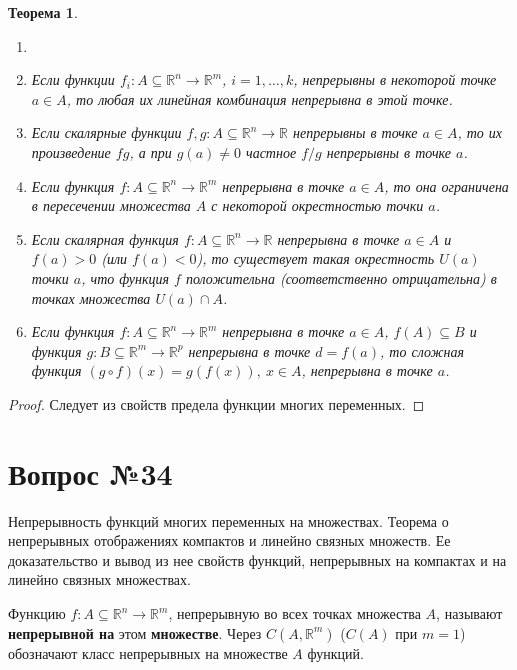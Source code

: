 \documentclass[12pt]{report}
\numberwithin{equation}{section}
\newtheorem{theorem}{Теорема}[section]
\begin{document}
\begin{theorem} \label{th:33:1}
\begin{enumerate}
\item[]
\item[а)] Если функции $f_i : A \subseteq \mathbb{R}^n \to \mathbb{R}^m$, $i = 1, \ldots, k$, непрерывны в некоторой точке $a \in A$, то любая их линейная комбинация непрерывна в этой точке.
\item[б)] Если скалярные функции $f,g : A \subseteq \mathbb{R}^n \to \mathbb{R}$ непрерывны в точке $a \in A$, то их произведение $fg$, а при $g(a) \neq 0$ частное $f/g$ непрерывны в точке $a$. 
\item[в)] Если функция $f : A \subseteq \mathbb{R}^n \to \mathbb{R}^m$ непрерывна в точке $a \in A$, то она ограничена в пересечении множества $A$ с некоторой окрестностью точки $a$.
\item[г)] Если скалярная функция  $f : A \subseteq \mathbb{R}^n \to \mathbb{R}$  непрерывна в точке $a \in A$ и $f(a) > 0$ (или $f(a) < 0$), то существует такая окрестность $U(a)$ точки $a$, что функция $f$ положительна (соответственно отрицательна) в точках множества $U(a) \cap A$. 
\item[д)] Если функция $f : A \subseteq  \mathbb{R}^n \to \mathbb{R}^m$ непрерывна в точке $a \in A$, $f(A) \subseteq B$ и функция $g : B \subseteq \mathbb{R}^m \to \mathbb{R}^p$ непрерывна в точке $d = f(a)$, то сложная функция $(g \circ f)(x) = g(f(x)),~x \in A $, непрерывна в точке $a$.
\end{enumerate}
\end{theorem}
\begin{proof} Следует из свойств предела функции многих переменных.
\end{proof}

\newpage \section{Вопрос №34} %
\begin{framed}
Непрерывность функций многих переменных на множествах. Теорема о непрерывных отображениях компактов и линейно связных множеств. Ее доказательство и вывод из нее свойств функций, непрерывных на компактах и на линейно связных множествах.
\end{framed}

Функцию $f : A \subseteq \mathbb{R}^n \to \mathbb{R}^m$, непрерывную во всех точках множества $A$, называют \textbf{непрерывной на} этом \textbf{множестве}. Через $C(A, \mathbb{R}^m)$ ($C(A)$ при $m = 1$) обозначают класс непрерывных на множестве $A$ функций.
\end{document}
